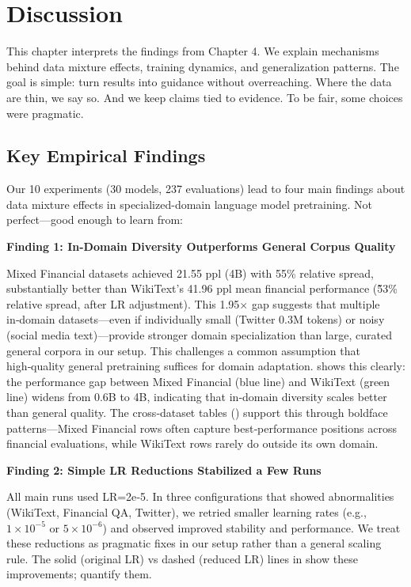 \chapter{Discussion}

This chapter interprets the findings from Chapter 4. We explain mechanisms behind data mixture effects, training dynamics, and generalization patterns. The goal is simple: turn results into guidance without overreaching. Where the data are thin, we say so. And we keep claims tied to evidence. To be fair, some choices were pragmatic.

\section{Key Empirical Findings}

Our 10 experiments (30 models, 237 evaluations) lead to four main findings about data mixture effects in specialized-domain language model pretraining. Not perfect—good enough to learn from:

\textbf{Finding 1: In-Domain Diversity Outperforms General Corpus Quality}

Mixed Financial datasets achieved 21.55 ppl (4B) with 55\% relative spread, substantially better than WikiText's 41.96 ppl mean financial performance (\~53\% relative spread, after LR adjustment). This 1.95$\times$ gap suggests that multiple in‑domain datasets—even if individually small (Twitter 0.3M tokens) or noisy (social media text)—provide stronger domain specialization than large, curated general corpora in our setup. This challenges a common assumption that high‑quality general pretraining suffices for domain adaptation.  shows this clearly: the performance gap between Mixed Financial (blue line) and WikiText (green line) widens from 0.6B to 4B, indicating that in‑domain diversity scales better than general quality. The cross‑dataset tables () support this through boldface patterns—Mixed Financial rows often capture best‑performance positions across financial evaluations, while WikiText rows rarely do outside its own domain.

\textbf{Finding 2: Simple LR Reductions Stabilized a Few Runs}

All main runs used LR=2e‑5. In three configurations that showed abnormalities (WikiText, Financial QA, Twitter), we retried smaller learning rates (e.g., $1\times10^{-5}$ or $5\times10^{-6}$) and observed improved stability and performance. We treat these reductions as pragmatic fixes in our setup rather than a general scaling rule. The solid (original LR) vs dashed (reduced LR) lines in  show these improvements;  quantify them.

